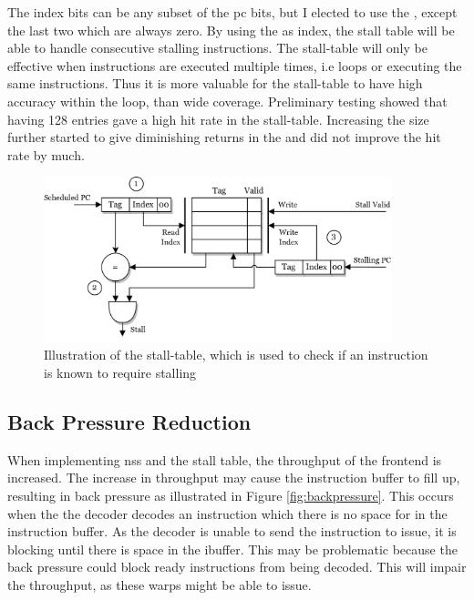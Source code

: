 The index bits can be any subset of the \acrshort{pc} bits, but I elected to use the , except the last two which are always zero. By using the  as index, the stall table will be able to handle consecutive stalling instructions. The stall-table will only be effective when instructions are executed multiple times, i.e loops or  executing the same instructions. Thus it is more valuable for the stall-table to have high accuracy within the loop, than wide coverage. Preliminary testing showed that having 128 entries gave a high hit rate in the stall-table. Increasing the size further started to give diminishing returns in the and did not improve the hit rate by much. 

\begin{figure}
    \centering
    \includegraphics[width=0.9\textwidth]{figures/stall_table.png}
    \caption[Illustration of the stall table.]{Illustration of the stall-table, which is used to check if an instruction is known to require stalling}
    \label{fig:stall_table}
\end{figure}



\subsection{Back Pressure Reduction}

When implementing \acrshort{nss} and the stall table, the throughput of the frontend is increased. The increase in throughput may cause the instruction buffer to fill up, resulting in back pressure as illustrated in Figure \ref{fig:backpressure}. This occurs when the the decoder decodes an instruction which there is no space for in the instruction buffer. As the decoder is unable to send the instruction to issue, it is blocking until there is space in the ibuffer. This may be problematic because the back pressure could block ready instructions from being decoded. This will impair the throughput, as these warps might be able to issue.

